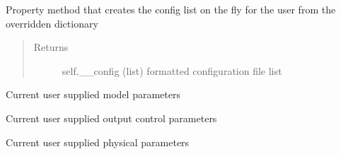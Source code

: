 \documentclass[letterpaper,10pt,english]{sphinxmanual}
\begin{document}
\begin{fulllineitems}
\begin{fulllineitems}
\end{fulllineitems}


\begin{fulllineitems}
\label{\detokenize{index:lb_colloids.Colloids.Colloid_IO.ColloidsConfig.config}}
Property method that creates the config list on the fly for the user from the overridden dictionary
\begin{quote}\begin{description}
\item[{Returns}] \leavevmode
self.\_\_config (list) formatted configuration file list

\end{description}\end{quote}

\end{fulllineitems}


\begin{fulllineitems}
\label{\detokenize{index:lb_colloids.Colloids.Colloid_IO.ColloidsConfig.model_parameters}}
Current user supplied model parameters

\end{fulllineitems}


\begin{fulllineitems}
\label{\detokenize{index:lb_colloids.Colloids.Colloid_IO.ColloidsConfig.output_control_parameters}}
Current user supplied output control parameters

\end{fulllineitems}


\begin{fulllineitems}
\label{\detokenize{index:lb_colloids.Colloids.Colloid_IO.ColloidsConfig.physical_parameters}}
Current user supplied physical parameters

\end{fulllineitems}


\end{fulllineitems}
\end{document}
